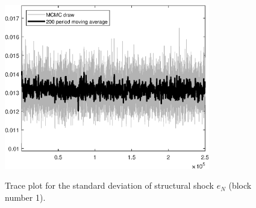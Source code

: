 \begin{figure}[H]
\centering
  \includegraphics[width=0.8\textwidth]{BRS_fd/graphs/TracePlot_SE_e_N_blck_1}\\
    \caption{Trace plot for the standard deviation of structural shock ${e_N}$ (block number 1).}
\end{figure}
